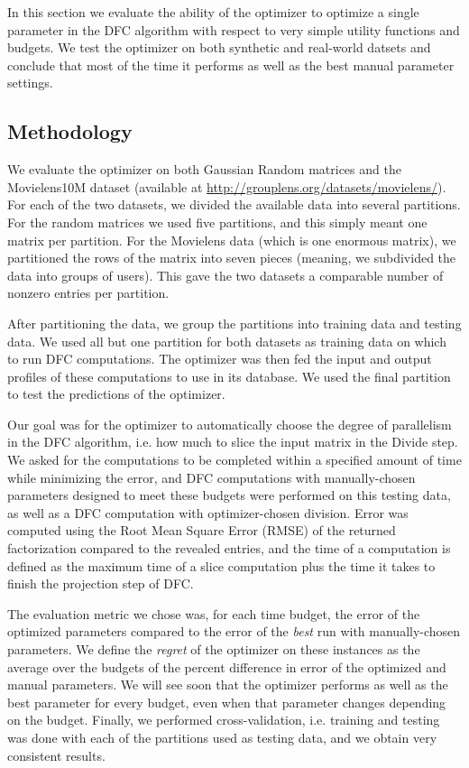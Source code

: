 
In this section we evaluate the ability of the optimizer to optimize 
a single parameter in the DFC algorithm with respect to very simple 
utility functions and budgets. We test the optimizer on both synthetic 
and real-world datsets and conclude that most of the time it performs 
as well as the best manual parameter settings. 

\subsection{Methodology}

We evaluate the optimizer on both Gaussian Random matrices and the 
Movielens10M dataset 
(available at \url{http://grouplens.org/datasets/movielens/}). 
For each of the two datasets, we divided the available data 
into several partitions. For the random matrices we used five 
partitions, and this simply meant one matrix per partition. 
For the Movielens data (which is one enormous matrix), we 
partitioned the rows of the matrix into seven pieces (meaning, we 
subdivided the data into groups of users). 
This gave the two datasets a comparable number of nonzero entries 
per partition. 

After partitioning the data, we group the partitions into training 
data and testing data. We used all but one partition for both datasets 
as training data on which to run DFC computations. The optimizer was 
then fed the input and output profiles of these computations to use 
in its database. We used the final partition to test the predictions 
of the optimizer. 

Our goal was for the optimizer to automatically choose the degree 
of parallelism in the DFC algorithm, i.e. how much to slice the 
input matrix in the Divide step. We asked for the computations to 
be completed within a specified amount of time while minimizing the 
error, and DFC computations with manually-chosen parameters designed 
to meet these budgets were performed on this testing data, as well as 
a DFC computation with optimizer-chosen division. Error was computed 
using the Root Mean Square Error (RMSE) of the returned factorization 
compared to the revealed entries, and the time of a computation is 
defined as the maximum time of a slice computation plus the time 
it takes to finish the projection step of DFC.  

The evaluation metric we chose was, for each time budget, the error 
of the optimized parameters compared to the error of the \emph{best} 
run with manually-chosen parameters. We define the \emph{regret} 
of the optimizer on these instances as the average over the budgets 
of the percent difference in error of the optimized and manual parameters. 
We will see soon that the optimizer performs as well as the best parameter 
for every budget, even when that parameter changes depending on the 
budget. Finally, we performed cross-validation, i.e. training and 
testing was done with each of the partitions used as testing data, 
and we obtain very consistent results. 

